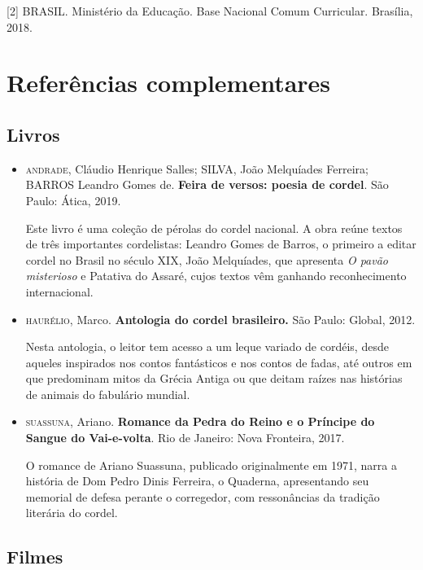 \documentclass[12pt]{extarticle}
\begin{document}
{[}2{]} BRASIL. Ministério da Educação. Base Nacional Comum Curricular.
Brasília, 2018.

\section{Referências complementares}


\subsection{Livros}

\begin{itemize}
\item \textsc{andrade}, Cláudio Henrique Salles; SILVA, João Melquíades Ferreira;
BARROS Leandro Gomes de. \textbf{Feira de versos: poesia de cordel}.
São Paulo: Ática, 2019.

Este livro é uma coleção de pérolas do cordel nacional. A obra reúne
textos de três importantes cordelistas: Leandro Gomes de Barros, o
primeiro a editar cordel no Brasil no século XIX, João Melquíades, que
apresenta \emph{O pavão misterioso} e Patativa do Assaré, cujos textos
vêm ganhando reconhecimento internacional.


\item \textsc{haurélio}, Marco. \textbf{Antologia do cordel brasileiro.} São Paulo:
Global, 2012.

Nesta antologia, o leitor tem acesso a um leque variado de cordéis,
desde aqueles inspirados nos contos fantásticos e nos contos de fadas,
até outros em que predominam mitos da Grécia Antiga ou que deitam raízes
nas histórias de animais do fabulário mundial.


\item \textsc{suassuna}, Ariano. \textbf{Romance da Pedra do Reino e o Príncipe do
Sangue do Vai-e-volta}. Rio de Janeiro: Nova Fronteira, 2017.

O romance de Ariano Suassuna, publicado originalmente em 1971, narra a
história de Dom Pedro Dinis Ferreira, o Quaderna, apresentando seu
memorial de defesa perante o corregedor, com ressonâncias da tradição
literária do cordel.
\end{itemize}

\subsection{Filmes}
\end{document}
